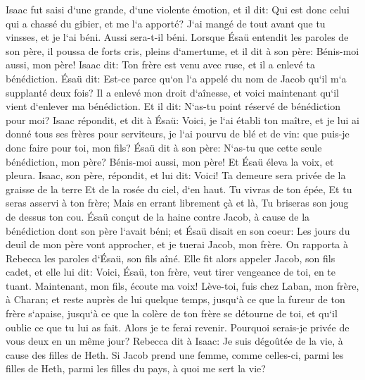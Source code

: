 \verse Isaac fut saisi d`une grande, d`une violente émotion, et il dit: Qui est donc celui qui a chassé du gibier, et me l`a apporté? J`ai mangé de tout avant que tu vinsses, et je l`ai béni. Aussi sera-t-il béni. 
\verse Lorsque Ésaü entendit les paroles de son père, il poussa de forts cris, pleins d`amertume, et il dit à son père: Bénis-moi aussi, mon père! 
\verse Isaac dit: Ton frère est venu avec ruse, et il a enlevé ta bénédiction. 
\verse Ésaü dit: Est-ce parce qu`on l`a appelé du nom de Jacob qu`il m`a supplanté deux fois? Il a enlevé mon droit d`aînesse, et voici maintenant qu`il vient d`enlever ma bénédiction. Et il dit: N`as-tu point réservé de bénédiction pour moi? 
\verse Isaac répondit, et dit à Ésaü: Voici, je l`ai établi ton maître, et je lui ai donné tous ses frères pour serviteurs, je l`ai pourvu de blé et de vin: que puis-je donc faire pour toi, mon fils? 
\verse Ésaü dit à son père: N`as-tu que cette seule bénédiction, mon père? Bénis-moi aussi, mon père! Et Ésaü éleva la voix, et pleura. 
\verse Isaac, son père, répondit, et lui dit: Voici! Ta demeure sera privée de la graisse de la terre Et de la rosée du ciel, d`en haut. 
\verse Tu vivras de ton épée, Et tu seras asservi à ton frère; Mais en errant librement çà et là, Tu briseras son joug de dessus ton cou. 
\verse Ésaü conçut de la haine contre Jacob, à cause de la bénédiction dont son père l`avait béni; et Ésaü disait en son coeur: Les jours du deuil de mon père vont approcher, et je tuerai Jacob, mon frère. 
\verse On rapporta à Rebecca les paroles d`Ésaü, son fils aîné. Elle fit alors appeler Jacob, son fils cadet, et elle lui dit: Voici, Ésaü, ton frère, veut tirer vengeance de toi, en te tuant. 
\verse Maintenant, mon fils, écoute ma voix! Lève-toi, fuis chez Laban, mon frère, à Charan; 
\verse et reste auprès de lui quelque temps, 
\verse jusqu`à ce que la fureur de ton frère s`apaise, jusqu`à ce que la colère de ton frère se détourne de toi, et qu`il oublie ce que tu lui as fait. Alors je te ferai revenir. Pourquoi serais-je privée de vous deux en un même jour? 
\verse Rebecca dit à Isaac: Je suis dégoûtée de la vie, à cause des filles de Heth. Si Jacob prend une femme, comme celles-ci, parmi les filles de Heth, parmi les filles du pays, à quoi me sert la vie? 

